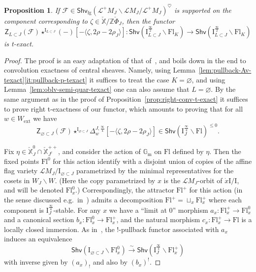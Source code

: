 \documentclass[11pt]{amsart}
\numberwithin{equation}{section}
\theoremstyle{plain}
\newtheorem{prop}[thm]{Proposition}
\theoremstyle{definition}
\newcommand{\sF}{{\mathcal F}}
\newcommand{\I}{{\mathrm I}}
\newcommand{\sL}{{\mathcal L}}
\newcommand{\X}{{\mathbb X}}
\newcommand{\Xd}{\check{\X}}
\newcommand{\Z}{{\mathbb Z}}
\newcommand{\Gm}{{\mathbb{G}_{\mathrm{m}}}}
\newcommand{\semi}{{{\frac{\infty}{2}}}}
\newcommand{\quar}{{{\frac{\infty}{4}}}}
\newcommand{\simto}{\xrightarrow{\sim}}
\newcommand{\ex}{\mathrm{ext}}
\newcommand{\Shv}{\mathsf{Shv}}
\newcommand{\Shvfg}{\mathsf{Shv}_{\mathrm{fg}}}
\newcommand{\Fl}{\mathrm{Fl}}
\newcommand{\comp}{\mathrm{c}}
\newcommand{\ZCen}{\mathsf{Z}}
\begin{document}
\begin{prop}
\label{prop:exactness-left-conv}
If $\sF \in \Shvfg(\sL^+ M_J \backslash \sL M_J / \sL^+ M_J)^\heartsuit$ is supported on the component corresponding to $\zeta \in \Xd / \Z \check{\Phi}_J$, then the functor
\[
\ZCen_{L \subset J}(\sF) \star^{\I_{L \subset J}} (-)[-\langle \zeta, 2\rho-2\rho_J \rangle] : \Shv \left( \I_{L \subset J}^\semi \backslash \Fl_K \right) \to \Shv \left( \I_{L \subset J}^\semi \backslash \Fl_K \right)
\]
is t-exact.
\end{prop}

\begin{proof}
The proof is an easy adaptation of that of~\cite[Proposition~3.3.20(ii)]{DL23}, and boils down in the end to convolution exactness of central sheaves. Namely, using Lemma~\ref{lem:pullback-Av-texact}\eqref{it:pullback-p-texact} it suffices to treat the case $K=\varnothing$, and using Lemma~\ref{lem:oblv-semi-quar-texact} one can also assume that $L=\varnothing$. By the same argument as in the proof of Proposition~\ref{prop:right-conv-t-exact} it suffices to prove right t-exactness of our functor, which amounts to proving that for all $w \in W_\ex$ we have
\begin{equation}
\label{eqn:proof-exactness-left-conv}
\ZCen_{\varnothing \subset J}(\sF) \star^{\I_{\varnothing \subset J}} \Delta^{J, \quar}_w [-\langle \zeta, 2\rho-2\rho_J \rangle] \in \Shv \left( \I_{J}^\quar \backslash \Fl \right)^{\leq 0}.
\end{equation}

Fix $\eta \in \Xd_J^0 \cap \Xd_{J^\comp}^{++}$, and consider the action of $\Gm$ on $\Fl$ defined by $\eta$. Then the fixed points $\Fl^0$ for this action identify with a disjoint union of copies of the affine flag variety $\sL M_J / \I_{\varnothing \subset J}$ parametrized by the minimal representatives for the cosets in $W_J \backslash W$. (Here the copy parametrized by $x$ is the $\sL M_J$-orbit of $\dot{x} \I/\I$, and will be denoted $\Fl^0_x$.) Correspondingly, the attractor $\Fl^+$ for this action (in the sense discussed e.g.~in~\cite[\S 1.1.2]{ARbook}) admits a decomposition $\Fl^+ = \sqcup_x \Fl^+_x$ where each component is $\I_{J}^\quar$-stable. For any $x$ we have a ``limit at $0$'' morphism $a_x : \Fl^+_x \to \Fl^0_x$ and a canonical section $b_x : \Fl^0_x \to \Fl^+_x$, and the natural morphism $c_x : \Fl^+_x \to \Fl$ is a locally closed immersion. As in~\cite[Lemma~3.3.2]{DL23}, the $!$-pullback functor associated with $a_x$ induces an equivalence
\[
\Shv(\I_{\varnothing \subset J} \backslash \Fl_x^0)  \simto  \Shv \left( \I_{J}^\quar \backslash \Fl^+_x \right)
\]
with inverse given by $(a_x)_!$ and also by $(b_x)^!$.


\end{proof}
\end{document}
